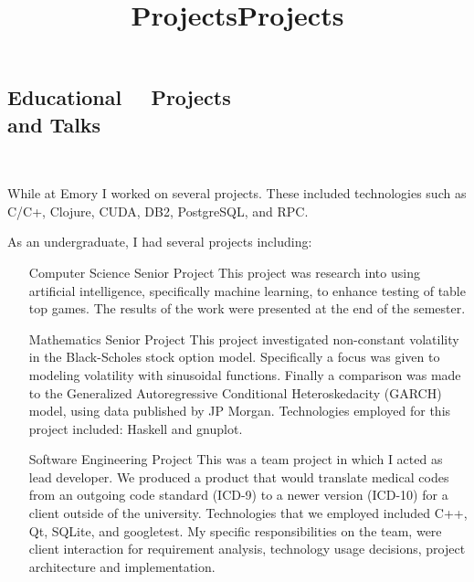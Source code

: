 \documentclass[margintitle,line]{res}
\begin{document}
\begin{resume}
%
%
%
%
%
%

\section{Educational \ \ Projects \\ and Talks}
\ \\

\title{Projects}
\begin{position}
While at Emory I worked on several projects. These included technologies such as C/C+, Clojure, CUDA, DB2, PostgreSQL, and RPC.
\end{position}

\title{Projects}
\begin{position}
As an undergraduate, I had several projects including:
\begin{itemize}
\item [Computer Science Senior Project] This project was research into using artificial intelligence, specifically machine learning, to enhance testing of table top games. The results of the work were presented at the end of the semester.

\item[Mathematics Senior Project] This project investigated non-constant volatility in the Black-Scholes stock option model. Specifically a focus was given to modeling volatility with sinusoidal functions. Finally a comparison was made to the Generalized Autoregressive Conditional Heteroskedacity (GARCH) model, using data published by JP Morgan. Technologies employed for this project included: Haskell and gnuplot.

\item[Software Engineering Project] This was a team project in which I acted as lead developer. We produced a product that would translate medical codes from an outgoing code standard (ICD-9) to a newer version (ICD-10) for a client outside of the university. Technologies that we employed included C++, Qt, SQLite, and googletest. My specific responsibilities on the team, were client interaction for requirement analysis, technology usage decisions, project architecture and implementation.


\end{itemize}
\end{position}
\end{resume}
\end{document}

